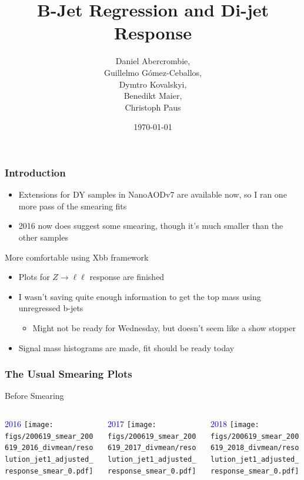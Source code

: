 \documentclass{beamer}
\author[D. Abercrombie]{
  Daniel Abercrombie, \\
  Guillelmo G\'omez-Ceballos, \\
  Dymtro Kovalskyi, \\
  Benedikt Maier, \\
  Christoph Paus
}
\title{\bf \sffamily B-Jet Regression and Di-jet Response}
\date{\today}
\begin{document}
\begin{frame}
  \titlepage
\end{frame}

\begin{frame}
  \frametitle{Introduction}

  \begin{itemize}
  \item Extensions for DY samples in NanoAODv7 are available now,
    so I ran one more pass of the smearing fits
  \item 2016 now does suggest some smearing, though it's much smaller than the other samples
  \end{itemize}

  More comfortable using Xbb framework

  \begin{itemize}
  \item Plots for $Z\rightarrow \ell\ell$ response are finished
  \item I wasn't saving quite enough information to get the top mass using unregressed b-jets
    \begin{itemize}
    \item Might not be ready for Wednesday, but doesn't seem like a show stopper
    \end{itemize}
  \item Signal mass histograms are made,
    fit should be ready today
  \end{itemize}

\end{frame}

\begin{frame}
  \frametitle{The Usual Smearing Plots}

  \vfill
  \centering
  Before Smearing
  \vfill

  \begin{columns}
    \begin{column}{0.33\linewidth}
      \centering
      \textcolor{blue}{2016}
      \texttt{[image: figs/200619\_smear\_200619\_2016\_divmean/resolution\_jet1\_adjusted\_response\_smear\_0.pdf]}
    \end{column}
    \begin{column}{0.34\linewidth}
      \centering
      \textcolor{blue}{2017}
      \texttt{[image: figs/200619\_smear\_200619\_2017\_divmean/resolution\_jet1\_adjusted\_response\_smear\_0.pdf]}
    \end{column}
    \begin{column}{0.33\linewidth}
      \centering
      \textcolor{blue}{2018}
      \texttt{[image: figs/200619\_smear\_200619\_2018\_divmean/resolution\_jet1\_adjusted\_response\_smear\_0.pdf]}
    \end{column}
  \end{columns}

\end{frame}
\end{document}
